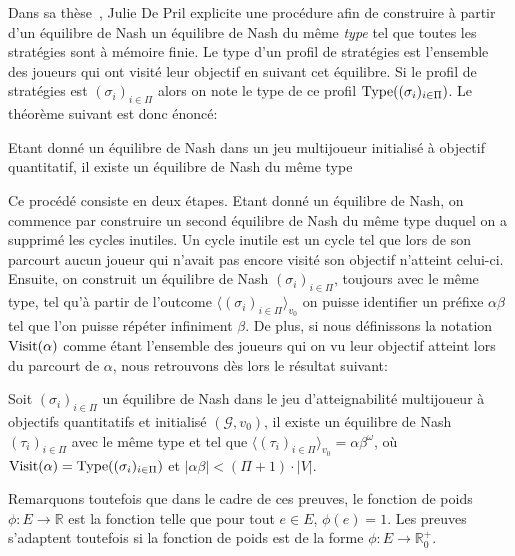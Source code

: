 Dans sa thèse~\cite{juliePhd}, Julie De Pril explicite une procédure afin de construire à partir d'un équilibre de Nash un équilibre de Nash du même \emph{type} tel que toutes les stratégies sont à mémoire finie. Le type d'un profil de stratégies est l'ensemble des joueurs qui ont visité leur objectif en suivant cet équilibre. Si le profil de stratégies est $(\sigma_i)_{i \in \Pi}$ alors on note le type de ce profil $\operatorname*{Type}((\sigma_i)_{i\in \Pi})$. Le théorème suivant est donc énoncé:

\begin{thm}
	Etant donné un équilibre de Nash dans un jeu multijoueur initialisé à objectif quantitatif, il existe un équilibre de Nash du même type
\end{thm}

Ce procédé consiste en deux étapes. Etant donné un équilibre de Nash, on commence par construire un second équilibre de Nash du même type duquel on a supprimé les cycles inutiles. Un cycle inutile est un cycle tel que lors de son parcourt aucun joueur qui n'avait pas encore visité son objectif n'atteint celui-ci. Ensuite, on construit un équilibre de Nash $(\sigma_i)_{i\in \Pi}$, toujours avec le même type, tel qu'à partir de l'outcome $\langle (\sigma_i)_{i\in \Pi}\rangle_{v_0}$ on puisse identifier un préfixe $\alpha\beta$ tel que l'on puisse répéter infiniment $\beta$. De plus, si nous définissons la notation $\operatorname*{Visit}(\alpha)$ comme étant l'ensemble des joueurs qui on vu leur objectif atteint lors du parcourt de $\alpha$, nous retrouvons dès lors le résultat suivant:

\begin{propriete}
	Soit $(\sigma_i)_{i\in \Pi}$ un équilibre de Nash dans le jeu d'atteignabilité multijoueur à objectifs quantitatifs et initialisé $(\mathcal{G}, v_0)$, il existe un équilibre de Nash $(\tau_i)_{i\in \Pi}$ avec le même type et tel que $\langle (\tau_i)_{i\in \Pi} \rangle_{v_0} = \alpha \beta^{\omega}$, où $\operatorname*{Visit}(\alpha) = \operatorname*{Type}((\sigma_i)_{i \in \Pi})$ et $|\alpha\beta| < (\Pi + 1)\cdot |V|$.
\end{propriete}
Remarquons toutefois que dans le cadre de ces preuves, le fonction de poids $\phi: E \rightarrow \mathbb{R}$ est la fonction telle que pour tout $e \in E$, $\phi(e) = 1$. Les preuves s'adaptent toutefois si la fonction de poids est de la forme $\phi : E \rightarrow \mathbb{R}^{+}_{0}$.\\
\\

